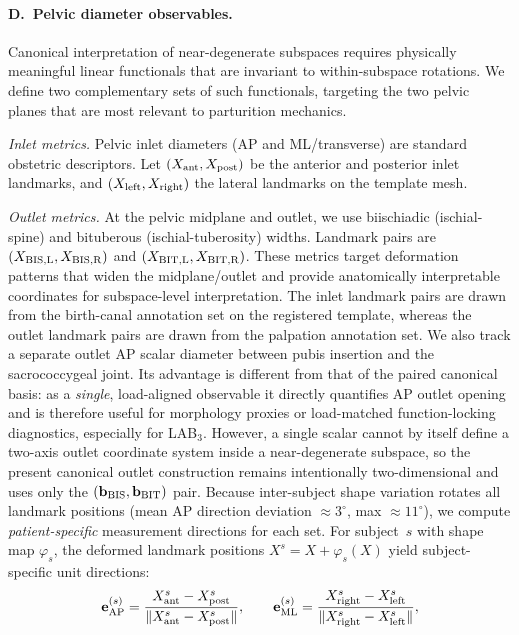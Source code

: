 \documentclass[11pt]{article}
\begin{document}
\paragraph{D.\ Pelvic diameter observables.}
Canonical interpretation of near-degenerate subspaces requires physically meaningful linear functionals that are invariant to within-subspace rotations.
We define two complementary sets of such functionals, targeting the two pelvic planes that are most relevant to parturition mechanics.

\emph{Inlet metrics.}  Pelvic inlet diameters (AP and ML/transverse) are standard obstetric descriptors.
Let $(X_{\rm ant}, X_{\rm post})$ be the anterior and posterior inlet landmarks, and $(X_{\rm left}, X_{\rm right})$ the lateral landmarks on the template mesh.

\emph{Outlet metrics.}  At the pelvic midplane and outlet, we use biischiadic (ischial-spine) and bituberous (ischial-tuberosity) widths.
Landmark pairs are $(X_{\rm BIS,L}, X_{\rm BIS,R})$ and $(X_{\rm BIT,L}, X_{\rm BIT,R})$.
These metrics target deformation patterns that widen the midplane/outlet and provide anatomically interpretable coordinates for subspace-level interpretation.
The inlet landmark pairs are drawn from the birth-canal annotation set on the registered template, whereas the outlet landmark pairs are drawn from the palpation annotation set.
We also track a separate outlet AP scalar diameter between pubis insertion and the sacrococcygeal joint.
Its advantage is different from that of the paired canonical basis: as a \emph{single}, load-aligned observable it directly quantifies AP outlet opening and is therefore useful for morphology proxies or load-matched function-locking diagnostics, especially for LAB$_3$.
However, a single scalar cannot by itself define a two-axis outlet coordinate system inside a near-degenerate subspace, so the present canonical outlet construction remains intentionally two-dimensional and uses only the $(\mathbf b_{\rm BIS},\mathbf b_{\rm BIT})$ pair.
Because inter-subject shape variation rotates all landmark positions (mean AP direction deviation $\approx 3^{\circ}$, max $\approx 11^{\circ}$), we compute \emph{patient-specific} measurement directions for each set.
For subject~$s$ with shape map $\varphi_s$, the deformed landmark positions $X^s = X + \varphi_s(X)$ yield subject-specific unit directions:
\begin{equation}
\mathbf e_{\rm AP}^{(s)} = \frac{X_{\rm ant}^s-X_{\rm post}^s}{\|X_{\rm ant}^s-X_{\rm post}^s\|},\qquad
\mathbf e_{\rm ML}^{(s)} = \frac{X_{\rm right}^s-X_{\rm left}^s}{\|X_{\rm right}^s-X_{\rm left}^s\|},
\end{equation}
\end{document}
